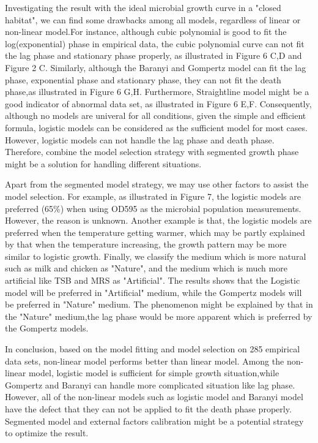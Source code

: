 \documentclass[11pt]{article}
\begin{document}
  Investigating the result with the ideal microbial growth curve in a "closed habitat", we can find some drawbacks among all models, regardless of linear or non-linear model.For instance, although cubic polynomial is good to fit the log(exponential) phase in empirical data, the cubic polynomial curve can not fit the lag phase and stationary phase properly, as illustrated in Figure 6 C,D and Figure 2 C. Similarly, although the Baranyi and Gompertz model can fit the lag phase, exponential phase and stationary phase, they can not fit the death phase,as illustrated in Figure 6 G,H. Furthermore, Straightline model might be a good indicator of abnormal data set, as illustrated in Figure 6 E,F. Consequently, although no models are univeral for all conditions, given the simple and efficient formula, logistic models can be considered as the sufficient model for most cases. However, logistic models can not handle the lag phase and death phase. Therefore, combine the model selection strategy with segmented growth phase might be a solution for handling different situations. 

  Apart from the segmented model strategy, we may use other factors to assist the model selection. For example, as illustrated in Figure 7, the logistic models are preferred (65\%) when using OD595 as the microbial population measurements. However, the reason is unknown. Another example is that, the logistic models are preferred when the temperature getting warmer, which may be partly explained by that when the temperature increasing, the growth pattern may be more similar to logistic growth\cite{de_silvestri_determination_2018}. Finally, we classify the medium which is more natural such as milk and chicken as "Nature", and the medium which is much more artificial like TSB and MRS as "Artificial". The results shows that the Logistic model will be preferred in "Artificial" medium, while the Gompertz models will be preferred in "Nature" medium. The phenomenon might be explained by that in the "Nature" medium,the lag phase would be more apparent which is preferred by the Gompertz models.
  
  In conclusion, based on the model fitting and model selection on 285 empirical data sets,  non-linear model performs better than linear model.
  Among the non-linear model, logistic model is sufficient for simple growth situation,while Gompertz and Baranyi can handle more complicated situation like lag phase. However, all of the non-linear models such as logistic model and Baranyi model have the defect that they can not be applied to fit the death phase properly. Segmented model and external factors calibration might be a potential strategy to optimize the result. 
  
\end{document}
